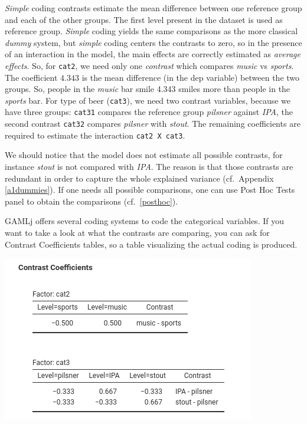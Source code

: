 \documentclass[
]{book}
\begin{document}
\emph{Simple} coding contrasts estimate the mean difference between one reference group and each of the other groups. The first level present in the dataset is used as reference group. \emph{Simple} coding yields the same comparisons as the more classical \emph{dummy} system, but \emph{simple} coding centers the contrasts to zero, so in the presence of an interaction in the model, the main effects are correctly estimated as \emph{average effects}. So, for \texttt{cat2}, we need only one \emph{contrast} which compares \emph{music} vs \emph{sports}. The coefficient \(4.343\) is the mean difference (in the dep variable) between the two groups. So, people in the \emph{music} bar smile 4.343 smiles more than people in the \emph{sports} bar. For type of beer (\texttt{cat3}), we need two contrast variables, because we have three groups: \texttt{cat31} compares the reference group \emph{pilsner} against \emph{IPA}, the second contrast \texttt{cat32} compares \emph{pilsner} with \emph{stout}. The remaining coefficients are required to estimate the interaction \texttt{cat2\ X\ cat3}.

We should notice that the model does not estimate all possible contrasts, for instance \emph{stout} is not compared with \emph{IPA}. The reason is that those contrasts are redundant in order to capture the whole explained variance (cf.~Appendix \ref{a1dummies}). If one needs all possible comparisons, one can use {Post Hoc Tests} panel to obtain the comparisons (cf.~\ref{posthoc}).

{GAMLj} offers several coding systems to code the categorical variables. If you want to take a look at what the contrasts are comparing, you can ask for {Contrast Coefficients tables}, so a table visualizing the actual coding is produced.

\includegraphics{bookletpics/2_anova_output4.png}
\end{document}
